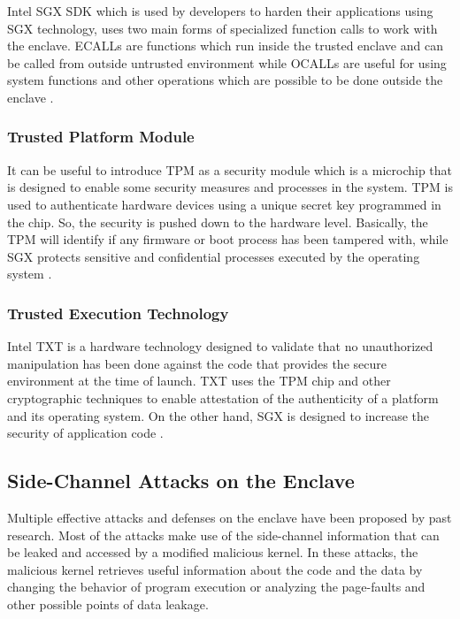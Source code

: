 Intel SGX SDK \cite{sgxapi} which is used by developers to harden their applications using SGX technology, uses two main forms of specialized function calls to work with the enclave. ECALLs are functions which run inside the trusted enclave and can be called from outside untrusted environment while OCALLs are useful for using system functions and other operations which are possible to be done outside the enclave \cite{ecallocall}.

\subsubsection{Trusted Platform Module}
It can be useful to introduce TPM as a security module which is a microchip that is designed to enable some security measures and processes in the system. TPM is used to authenticate hardware devices using a unique secret key programmed in the chip. So, the security is pushed down to the hardware level. Basically, the TPM will identify if any firmware or boot process has been tampered with, while SGX protects sensitive and confidential processes executed by the operating system \cite{wptpm,sptpm}.

\subsubsection{Trusted Execution Technology}
Intel TXT is a hardware technology designed to validate that no unauthorized manipulation has been done against the code that provides the secure environment at the time of launch. TXT uses the TPM chip and other cryptographic techniques to enable attestation of the authenticity of a platform and its operating system. On the other hand, SGX is designed to increase the security of application code \cite{txt}.

\subsection{Side-Channel Attacks on the Enclave}

Multiple effective attacks and defenses on the enclave have been proposed by past research. Most of the attacks make use of the side-channel information that can be leaked and accessed by a modified malicious kernel. In these attacks, the malicious kernel retrieves useful information about the code and the data by changing the behavior of program execution or analyzing the page-faults and other possible points of data leakage.

